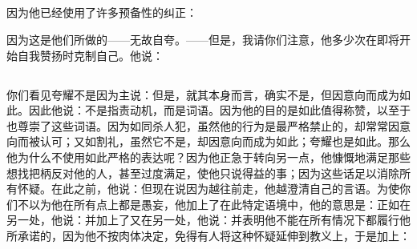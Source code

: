 
\subsection{}

因为他已经使用了许多预备性的纠正：\par

因为这是他们所做的——无故自夸。——但是，我请你们注意，他多少次在即将开始自我赞扬时克制自己。他说：\par


\subsection{}

\par

你们看见夸耀不是因为主说：但是，就其本身而言，确实不是，但因意向而成为如此。因此他说：不是指责动机，而是词语。因为他的目的是如此值得称赞，以至于也尊崇了这些词语。因为如同杀人犯，虽然他的行为是最严格禁止的，却常常因意向而被认可；又如割礼，虽然它不是，却因意向而成为如此；夸耀也是如此。那么他为什么不使用如此严格的表达呢？因为他正急于转向另一点，他慷慨地满足那些想找把柄反对他的人，甚至过度满足，使他只说得益的事；因为这些话足以消除所有怀疑。在此之前，他说：但现在说因为越往前走，他越澄清自己的言语。为使你们不以为他在所有点上都是愚妄，他加上了在此特定语境中，他的意思是：正如在另一处，他说：并加上了又在另一处，他说：并表明他不能在所有情况下都履行他所承诺的，因为他不按肉体决定，免得有人将这种怀疑延伸到教义上，于是加上：\par

